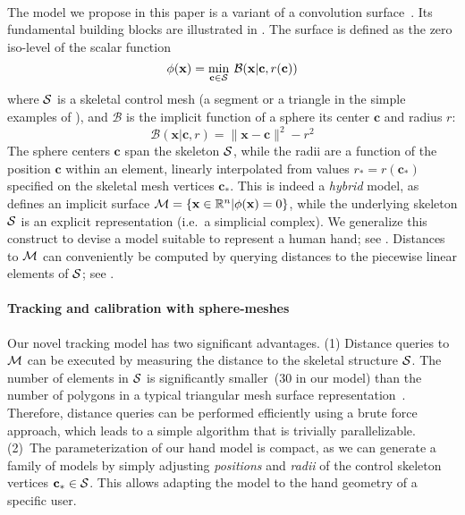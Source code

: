 \paragraph{}
The model we propose in this paper is a variant of a convolution surface~\cite{bloomenthal1991convolution}. Its fundamental building blocks are illustrated in . The surface is defined as the zero iso-level of the scalar function
% 
\begin{equation}
\phi(\mathbf{x}) = \min_{\mathbf{c} \in \mathcal{S}} \: \mathcal{B}(\mathbf{x} | \mathbf{c}, r(\mathbf{c}))
\label{eq:convsurf}
\end{equation}
% 
where $\mathcal{S}$ is a skeletal control mesh (a segment or a triangle in the simple examples of ), and $\mathcal{B}$ is the implicit function of a sphere  its center $\mathbf{c}$ and radius $r$:
% 
\begin{equation}
\mathcal{B}(\mathbf{x} | \mathbf{c},r ) = \|\mathbf{x}-\mathbf{c}\|^2 - r^2
\end{equation}
% 
The sphere centers $\mathbf{c}$ span the skeleton $\mathcal{S}$, while the radii are a function of the position $\mathbf{c}$ within an element, linearly interpolated from values $r_*=r(\mathbf{c}_*)$ specified on the skeletal mesh vertices $\mathbf{c}_*$. This is indeed a \emph{hybrid} model, as  defines an implicit surface $\mathcal{M} = \{\mathbf{x} \in \mathbb{R}^n | \phi(\mathbf{x})=0 \}$, while the underlying skeleton $\mathcal{S}$ is an explicit representation (i.e.\ a simplicial complex). We generalize this construct to devise a model suitable to represent a human hand; see .
Distances to $\mathcal{M}$ can conveniently be computed by querying distances to the piecewise linear elements of $\mathcal{S}$; see .


\paragraph{Tracking and calibration with sphere-meshes}
Our novel tracking model has two significant advantages. (1) Distance queries to $\mathcal{M}$ can be executed by measuring the distance to the skeletal structure $\mathcal{S}$. The number of elements in $\mathcal{S}$ is significantly smaller~(30 in our model) than the number of polygons in a typical triangular mesh surface representation~\cite{thiery2013sphere}. 
Therefore, distance queries can be performed efficiently using a brute force approach, which leads to a simple algorithm that is trivially parallelizable.
(2)~The parameterization of our hand model is compact, as we can generate a family of models by simply adjusting \emph{positions} and \emph{radii} of the control skeleton vertices $\mathbf{c}_* \in \mathcal{S}$. This allows adapting the model to the hand geometry of a specific user.

